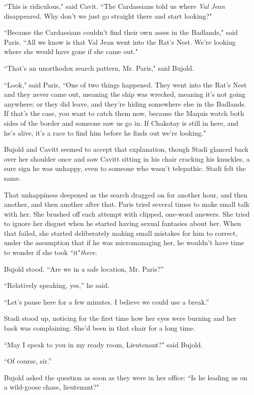 \documentclass[twoside,letterpaper,12pt]{memoir}
\begin{document}
``This is ridiculous," said Cavit. ``The Cardassians told us where \textit{Val Jean} disappeared. Why don't we just go straight there and start looking?"

``Because the Cardassians couldn't find their own asses in the Badlands," said Paris. ``All we know is that Val Jean went into the Rat's Nest. We're looking where she would have gone if she came out."

``That's an unorthodox search pattern, Mr. Paris," said Bujold.

``Look," said Paris, ``One of two things happened. They went into the Rat's Nest and they never came out, meaning the ship was wrecked, meaning it's not going anywhere; or they did leave, and they're hiding somewhere else in the Badlands. If that's the case, you want to catch them now, because the Maquis watch both sides of the border and someone saw us go in. If Chakotay is still in here, and he's alive, it's a race to find him before he finds out we're looking."

Bujold and Cavitt seemed to accept that explanation, though Stadi glanced back over her shoulder once and saw Cavitt sitting in his chair cracking his knuckles, a sure sign he was unhappy, even to someone who wasn’t telepathic. Stadi felt the same.

That unhappiness deepened as the search dragged on for another hour, and then another, and then another after that. Paris tried several times to make small talk with her. She brushed off each attempt with clipped, one-word answers. She tried to ignore her disgust when he started having sexual fantasies about her. When that failed, she started deliberately making small mistakes for him to correct, under the assumption that if he was micromanaging her, he wouldn't have time to wonder if she took ``it"\textit{there}.

Bujold stood. ``Are we in a safe location, Mr. Paris?''

``Relatively speaking, yes,'' he said.

``Let’s pause here for a few minutes. I believe we could use a break.''

Stadi stood up, noticing for the first time how her eyes were burning and her back was complaining. She’d been in that chair for a long time.

``May I speak to you in my ready room, Lieutenant?" said Bujold.

``Of course, sir.''

Bujold asked the question as soon as they were in her office: ``Is he leading us on a wild-goose chase, lieutenant?"
\end{document}
